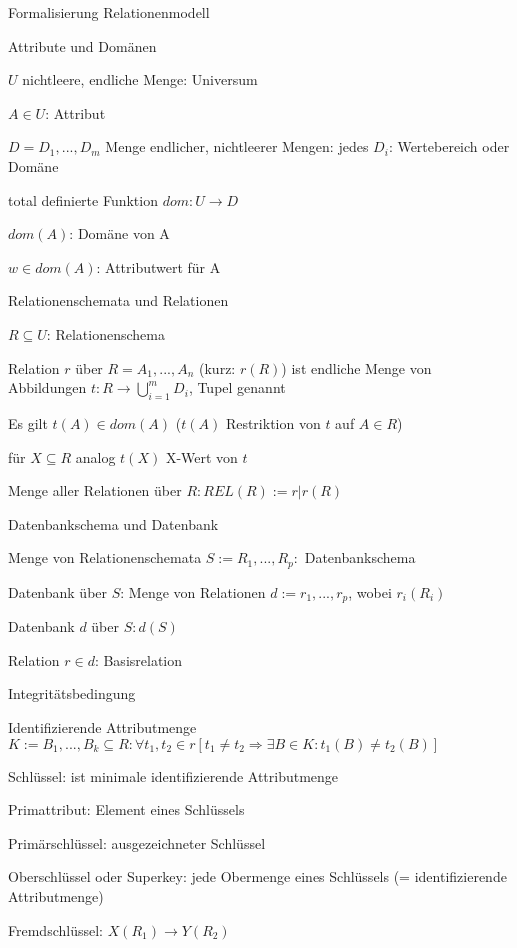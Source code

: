 \documentclass[a4paper]{article}
\begin{document}
\begin{multicols}{3}
Formalisierung Relationenmodell
\begin{itemize*}
    \item Attribute und Domänen
    \begin{itemize*}
        \item $U$ nichtleere, endliche Menge: Universum
        \item $A\in U$: Attribut
        \item $D = {D_1,..., D_m}$ Menge endlicher, nichtleerer Mengen: jedes $D_i$: Wertebereich oder Domäne
        \item total definierte Funktion $dom:U \rightarrow D$
        \item $dom(A)$: Domäne von A
        \item $w \in dom(A)$: Attributwert für A
    \end{itemize*}
    \item Relationenschemata und Relationen
    \begin{itemize*}
        \item $R\subseteq U$: Relationenschema
        \item Relation $r$ über $R = {A_1,..., A_n}$ (kurz: $r(R)$) ist endliche Menge von Abbildungen $t:R \rightarrow \bigcup_{i=1}^{m} D_i$, Tupel genannt
        \item Es gilt $t(A) \in dom(A)$ ($t(A)$ Restriktion von $t$ auf $A \in R$)
        \item für $X\subseteq R$ analog $t(X)$ X-Wert von $t$
        \item Menge aller Relationen über $R: REL(R) := {r | r(R)}$
    \end{itemize*}
    \item Datenbankschema und Datenbank
    \begin{itemize*}
        \item Menge von Relationenschemata $S := {R_1,..., R_p }:$ Datenbankschema
        \item Datenbank über $S$: Menge von Relationen $d:={r_1,..., r_p}$, wobei $r_i (R_i)$
        \item Datenbank $d$ über $S: d(S)$
        \item Relation $r\in d$: Basisrelation
    \end{itemize*}

    Integritätsbedingung
    \begin{itemize*}
        \item Identifizierende Attributmenge $K:= {B_1,..., B_k } \subseteq R: \forall t_1, t_2 \in r [t_1 \not = t_2 \Rightarrow \exists B \in K: t_1(B) \not = t_2(B)]$
        \item Schlüssel: ist minimale identifizierende Attributmenge
        \item Primattribut: Element eines Schlüssels
        \item Primärschlüssel: ausgezeichneter Schlüssel
        \item Oberschlüssel oder Superkey: jede Obermenge eines Schlüssels (= identifizierende Attributmenge)
        \item Fremdschlüssel: $X(R_1)\rightarrow Y(R_2)$
    \end{itemize*}
\end{itemize*}



\end{multicols}
\end{document}
